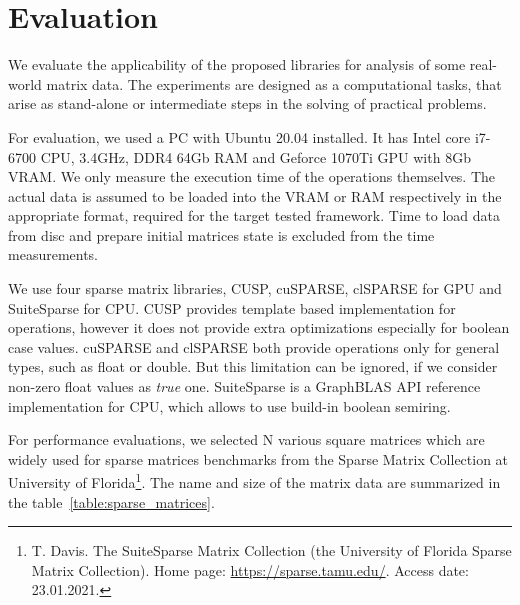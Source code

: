 \section{Evaluation}



We evaluate the applicability of the proposed libraries for analysis of some real-world matrix data.
The experiments are designed as a computational tasks, that arise as stand-alone or intermediate steps
in the solving of practical problems.  

For evaluation, we used a PC with Ubuntu 20.04 installed.
It has Intel core i7-6700 CPU, 3.4GHz, DDR4 64Gb RAM and Geforce 1070Ti GPU with 8Gb VRAM.
We only measure the execution time of the operations themselves.
The actual data is assumed to be loaded into the VRAM or RAM respectively in the appropriate format, required for the target tested framework.
Time to load data from disc and prepare initial matrices state is excluded from the time measurements.

We use four sparse matrix libraries, CUSP, cuSPARSE, clSPARSE for GPU and SuiteSparse for CPU. 
CUSP provides template based implementation for operations, however it does not provide extra optimizations especially for boolean case values. cuSPARSE and clSPARSE both provide operations only for general types, such as float or double. 
But this limitation can be ignored, if we consider non-zero float values as \textit{true} one.
SuiteSparse is a GraphBLAS API reference implementation for CPU, which allows to use build-in boolean semiring.

For performance evaluations, we selected N various square matrices which are widely used for sparse matrices benchmarks
from the Sparse Matrix Collection at University of Florida\footnote{T. Davis. The SuiteSparse Matrix Collection (the University of Florida Sparse Matrix Collection). Home page: \url{https://sparse.tamu.edu/}. Access date: 23.01.2021.}.
The name and size of the matrix data are summarized in the table~\ref{table:sparse_matrices}. 

